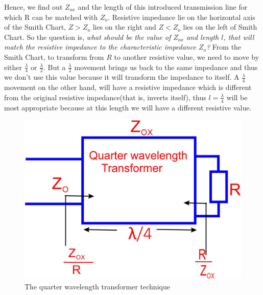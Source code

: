 Hence, we find out $ Z_{ox}$ and the length of this introduced transmission line for which R can be matched with $ Z_o$. Resistive impedance lie on the horizontal axis of the Smith Chart, $Z > Z_o$ lies on the right and $Z < Z_o$ lies on the left of Smith Chart. So the question is, \emph{what should be the value of $Z_{ox}$ and length $l$, that will match the resistive impedance to the characteristic impedance $Z_o$?} From the Smith Chart, to transform from $R$ to another resistive value, we need to move by either $ \frac{\lambda}{4}$ or $ \frac{\lambda}{2}$. But a $\frac{\lambda}{2}$ movement brings us back to the same impedance and thus we don't use this value because it will transform the impedance to itself. A $\frac{\lambda}{4}$ movement on the other hand, will have a resistive impedance which is different from the original resistive impedance(that is, inverts itself), thus $l = \frac{\lambda}{4} $ will be most appropriate because at this length we will have a different resistive value.
\begin{figure}[h]
\centering
\includegraphics[width=0.7\linewidth]{./graphics/fig9}
\caption{The quarter wavelength transformer technique}
\label{fig:fig9}
\end{figure}

